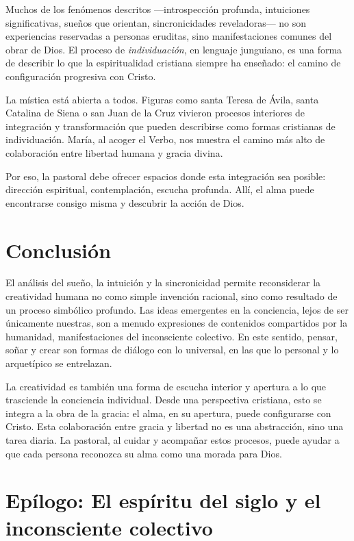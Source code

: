 \documentclass[12pt]{article}
\begin{document}
Muchos de los fenómenos descritos —introspección profunda, intuiciones significativas, sueños que orientan, sincronicidades reveladoras— no son experiencias reservadas a personas eruditas, sino manifestaciones comunes del obrar de Dios. El proceso de \textit{individuación}, en lenguaje junguiano, es una forma de describir lo que la espiritualidad cristiana siempre ha enseñado: el camino de configuración progresiva con Cristo.

La mística está abierta a todos. Figuras como santa Teresa de Ávila, santa Catalina de Siena o san Juan de la Cruz vivieron procesos interiores de integración y transformación que pueden describirse como formas cristianas de individuación. María, al acoger el Verbo, nos muestra el camino más alto de colaboración entre libertad humana y gracia divina.

Por eso, la pastoral debe ofrecer espacios donde esta integración sea posible: dirección espiritual, contemplación, escucha profunda. Allí, el alma puede encontrarse consigo misma y descubrir la acción de Dios.

\section*{Conclusión}

El análisis del sueño, la intuición y la sincronicidad permite reconsiderar la creatividad humana no como simple invención racional, sino como resultado de un proceso simbólico profundo. Las ideas emergentes en la conciencia, lejos de ser únicamente nuestras, son a menudo expresiones de contenidos compartidos por la humanidad, manifestaciones del inconsciente colectivo. En este sentido, pensar, soñar y crear son formas de diálogo con lo universal, en las que lo personal y lo arquetípico se entrelazan.

La creatividad es también una forma de escucha interior y apertura a lo que trasciende la conciencia individual. Desde una perspectiva cristiana, esto se integra a la obra de la gracia: el alma, en su apertura, puede configurarse con Cristo. Esta colaboración entre gracia y libertad no es una abstracción, sino una tarea diaria. La pastoral, al cuidar y acompañar estos procesos, puede ayudar a que cada persona reconozca su alma como una morada para Dios.

\section*{Epílogo: El espíritu del siglo y el inconsciente colectivo}
\end{document}
